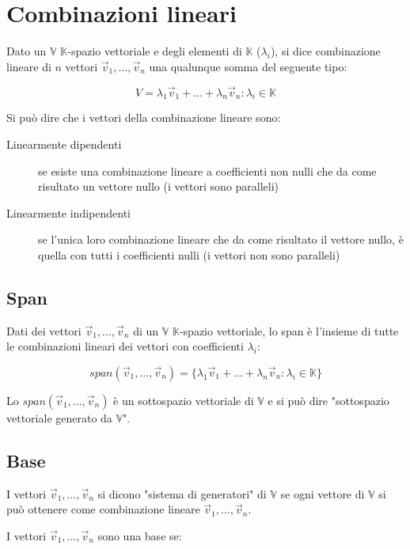 \documentclass{article}
\begin{document}
\section{Combinazioni lineari}

Dato un $\mathbb{V}$ $\mathbb{K}$-spazio vettoriale e degli elementi di $\mathbb{K}$ ($\lambda_i$), si dice combinazione lineare di $n$ vettori $\vec{v}_1, \dots, \vec{v}_n$ una qualunque somma del seguente tipo:

$$
V = \lambda_1 \vec{v}_1 + \dots + \lambda_n \vec{v}_n : \lambda_i \in \mathbb{K}
$$

\noindent
Si può dire che i vettori della combinazione lineare sono:

\begin{description}
    \item[Linearmente dipendenti] se esiste una combinazione lineare a coefficienti non nulli che da come risultato un vettore nullo (i vettori sono paralleli)
    \item[Linearmente indipendenti] se l'unica loro combinazione lineare che da come risultato il vettore nullo, è quella con tutti i coefficienti nulli (i vettori non sono paralleli)
\end{description}

\subsection{Span}

Dati dei vettori $\vec{v}_1, \dots, \vec{v}_n$ di un $\mathbb{V}$ $\mathbb{K}$-spazio vettoriale, lo span è l'insieme di tutte le combinazioni lineari dei vettori con coefficienti $\lambda_i$:

$$
span(\vec{v}_1, \dots, \vec{v}_n) = \{ \lambda_1 \vec{v}_1 + \dots + \lambda_n \vec{v}_n : \lambda_i \in \mathbb{K} \}
$$

\noindent
Lo $span(\vec{v}_1, \dots, \vec{v}_n)$ è un sottospazio vettoriale di $\mathbb{V}$ e si può dire "sottospazio vettoriale generato da $\mathbb{V}$".

\subsection{Base}

I vettori $\vec{v}_1, \dots, \vec{v}_n$ si dicono "sistema di generatori" di $\mathbb{V}$ se ogni vettore di $\mathbb{V}$ si può ottenere come combinazione lineare $\vec{v}_1, \dots, \vec{v}_n$.

\noindent
I vettori $\vec{v}_1, \dots, \vec{v}_n$ sono una base se:
\end{document}
